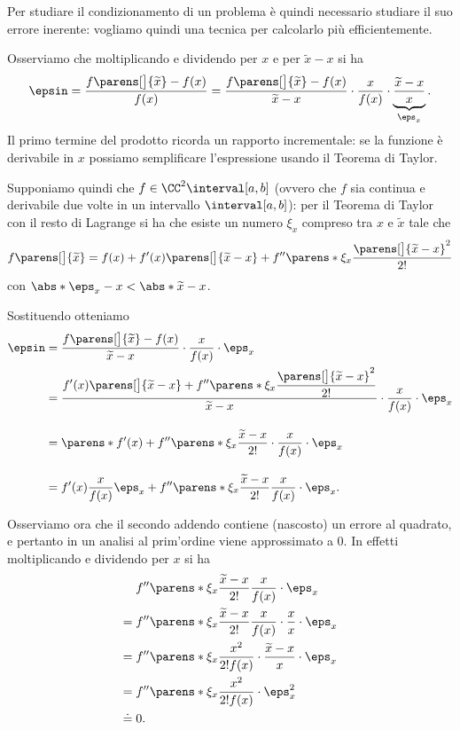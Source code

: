 Per studiare il condizionamento di un problema è quindi necessario studiare il suo errore inerente: vogliamo quindi una tecnica per calcolarlo più efficientemente.

Osserviamo che moltiplicando e dividendo per $x$ e per $\tilde x - x$ si ha \begin{align*}
    \epsin = \frac{f\parens[\big]{\tilde x} - f(x)}{f(x)}
    = \frac{f\parens[\big]{\tilde x} - f(x)}{\tilde x - x} \cdot \frac{x}{f(x)} \cdot \underbrace{\frac{\tilde x - x}{x}}_{\eps_x}.    
\end{align*} Il primo termine del prodotto ricorda un rapporto incrementale: se la funzione è derivabile in $x$ possiamo semplificare l'espressione usando il Teorema di Taylor.

Supponiamo quindi che $f \in \CC^2\interval[{a, b}]$ (ovvero che $f$ sia continua e derivabile due volte in un intervallo $\interval[{a, b}]$): per il Teorema di Taylor con il resto di Lagrange si ha che esiste un numero $\xi_x$ compreso tra $x$ e $\tilde x$ tale che \[
    f\parens[\big]{\tilde x} = f(x) + f'(x)\parens[\big]{\tilde x - x} + f''\parens*{\xi_x}\frac{\parens[\big]{\tilde x - x}^2}{2!}
\] con $\abs*{\eps_x - x} < \abs*{\tilde x - x}$. 

Sostituendo otteniamo \begin{align*}
    \epsin &=  \frac{f\parens[\big]{\tilde x} - f(x)}{\tilde x - x} \cdot \frac{x}{f(x)} \cdot \eps_x\\
    &= \frac{\displaystyle f'(x)\parens[\big]{\tilde x - x} + f''\parens*{\xi_x}\frac{\parens[\big]{\tilde x - x}^2}{2!}}{\tilde x - x} \cdot \frac{x}{f(x)} \cdot \eps_x\\[1em]
    &= \parens*{f'(x) + f''\parens*{\xi_x}\frac{\tilde x - x}{2!}} \cdot \frac{x}{f(x)} \cdot \eps_x\\[1em]
    &= f'(x) \frac{x}{f(x)} \eps_x + f''\parens*{\xi_x}\frac{\tilde x - x}{2!}\frac{x}{f(x)} \cdot \eps_x. 
\end{align*}

Osserviamo ora che il secondo addendo contiene (nascosto) un errore al quadrato, e pertanto in un analisi al prim'ordine viene approssimato a $0$. In effetti moltiplicando e dividendo per $x$ si ha \begin{align*}
    &f''\parens*{\xi_x}\frac{\tilde x - x}{2!}\frac{x}{f(x)} \cdot \eps_x \\
    = {}&f''\parens*{\xi_x}\frac{\tilde x - x}{2!}\frac{x}{f(x)} \cdot \frac{x}{x} \cdot \eps_x \\
    = {}&f''\parens*{\xi_x}\frac{x^2}{2!f(x)} \cdot \frac{\tilde x - x}{x} \cdot \eps_x \\
    = {}&f''\parens*{\xi_x}\frac{x^2}{2!f(x)} \cdot \eps_x^2\\
    \doteq {}& 0.
\end{align*}

